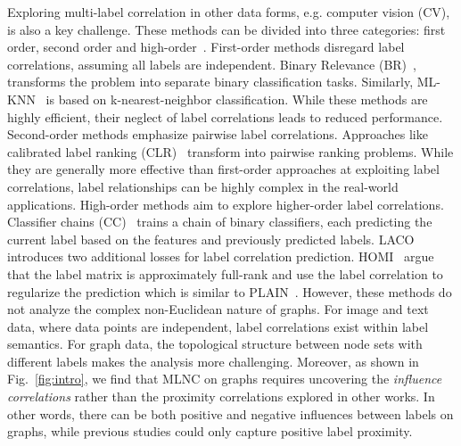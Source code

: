 Exploring multi-label correlation in other data forms, e.g. computer vision (CV), is also a key challenge.
These methods can be divided into three categories: first order, second order and high-order~\citep{zhang2010multi}.
First-order methods disregard label correlations, assuming all labels are independent. Binary Relevance (BR)~\citep{Tsoumakas2010MiningMD}, transforms the problem into separate binary classification tasks. Similarly, ML-KNN~\citep{10.1016/j.patcog.2006.12.019} is based on k-nearest-neighbor classification. While these methods are highly efficient, their neglect of label correlations leads to reduced performance.
Second-order methods emphasize pairwise label correlations. Approaches like calibrated label ranking (CLR)~\citep{furnkranz2008multilabel} transform into pairwise ranking problems. While they are generally more effective than first-order approaches at exploiting label correlations, label relationships can be highly complex in the real-world applications.
High-order methods aim to explore higher-order label correlations. Classifier chains (CC)~\citep{10.1007/978-3-642-04174-7_17} trains a chain of binary classifiers, each predicting the current label based on the features and previously predicted labels.
LACO~\citep{zhang2021enhancing} introduces two additional losses for label correlation prediction.
HOMI~\citep{si2023multi} argue that the label matrix is approximately full-rank and use the label correlation to regularize the prediction which is similar to PLAIN~\citep{wang2023deep}.
However, these methods do not analyze the complex non-Euclidean nature of graphs. For image and text data, where data points are independent, label correlations exist within label semantics. For graph data, the topological structure between node sets with different labels makes the analysis more challenging. Moreover, as shown in Fig.~\ref{fig:intro}, we find that MLNC on graphs requires uncovering the \emph{influence correlations} rather than the proximity correlations explored in other works. In other words, there can be both positive and negative influences between labels on graphs, while previous studies could only capture positive label proximity.



